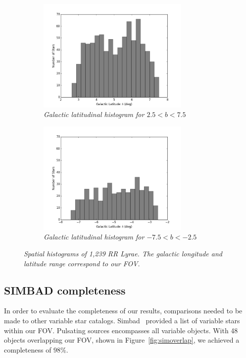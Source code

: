 \documentclass[aps,prb,twocolumn,superscriptaddress]{revtex4-1}
\begin{document}
\begin{figure}
	\begin{subfigure}{.5\textwidth}
	  \centering
	  \includegraphics[width=2.9in]{figures/PlotsSpace15/bphist_limit15.png}
		\caption{\it \small{Galactic latitudinal histogram for $2.5 < b < 7.5$}}
		\label{fig:bphist}
	\end{subfigure}%
	\begin{subfigure}{.5\textwidth}
	  \centering
			\includegraphics[width=2.9in]{figures/PlotsSpace15/bnhist_limit15.png}
		\caption{\it \small{Galactic latitudinal histogram for $-7.5 < b < -2.5$}}
		\label{fig:bnhist}
	\end{subfigure}%
	\caption{\it \small{Spatial histograms of 1,239 RR Lyrae. The galactic longitude and latitude range correspond to our FOV.}}
	\label{fig:blhist}
\end{figure}




\subsection{SIMBAD completeness}

In order to evaluate the completeness of our results, comparisons needed to be made to other variable star catalogs.  Simbad~\cite{simbad} provided a list of variable stars within our FOV.  Pulsating sources encompasses all variable objects.  With 48 objects overlapping our FOV, shown in Figure~\ref{fig:simoverlap}, we achieved a completeness of $98\%$.
\end{document}
